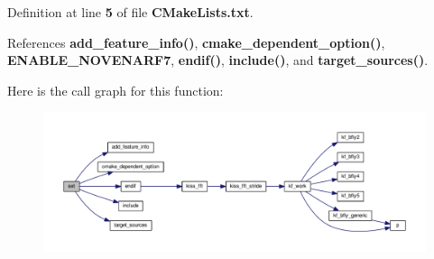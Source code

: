 Definition at line {\bf 5} of file {\bf C\+Make\+Lists.\+txt}.



References {\bf add\+\_\+feature\+\_\+info()}, {\bf cmake\+\_\+dependent\+\_\+option()}, {\bf E\+N\+A\+B\+L\+E\+\_\+\+N\+O\+V\+E\+N\+A\+R\+F7}, {\bf endif()}, {\bf include()}, and {\bf target\+\_\+sources()}.



Here is the call graph for this function\+:
\nopagebreak
\begin{figure}[H]
\begin{center}
\leavevmode
\includegraphics[width=350pt]{d4/d3b/limesuite-dev_2src_2ConnectionNovenaRF7_2CMakeLists_8txt_ae12046caeed448f74c25bb8979b47774_cgraph}
\end{center}
\end{figure}


